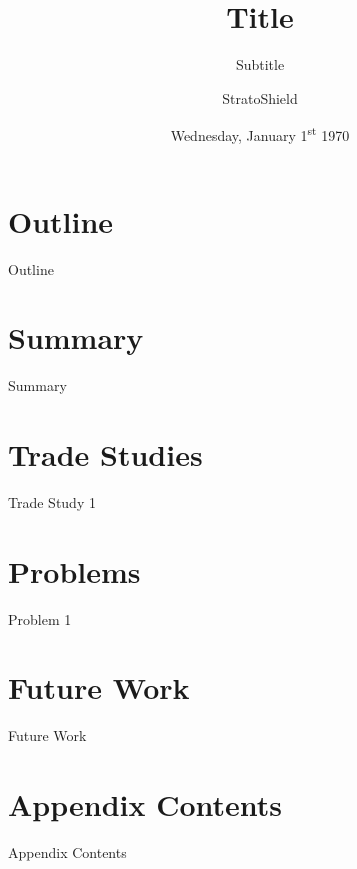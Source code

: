 \documentclass{beamer}
\title[Short Title]{Title}
\subtitle{Subtitle}
\author{StratoShield}
\institute{Iowa State University}
\date{Wednesday, January 1\textsuperscript{st} 1970}
\begin{document}
    \begin{frame}
        \titlepage
    \end{frame}

    \section*{Outline}

    \begin{frame}{Outline}
        \tableofcontents
    \end{frame}

    \section{Summary}

    \begin{frame}{Summary}
        
    \end{frame}

    \section{Trade Studies}

    \begin{frame}{Trade Study 1}
        
    \end{frame}

    \section{Problems}

    \begin{frame}{Problem 1}
        
    \end{frame}

    \section{Future Work}

    \begin{frame}{Future Work}
        
    \end{frame}

    \appendix

    \section*{Appendix Contents}

    \begin{frame}{Appendix Contents}
        \tableofcontents
    \end{frame}
\end{document}
